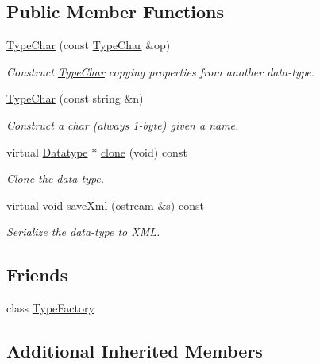 \subsection*{Public Member Functions}
\begin{DoxyCompactItemize}
\item 
\mbox{\hyperlink{class_type_char_a4831c7367bf6b04217f778e3afc9ff3c}{Type\+Char}} (const \mbox{\hyperlink{class_type_char}{Type\+Char}} \&op)
\begin{DoxyCompactList}\small\item\em Construct \mbox{\hyperlink{class_type_char}{Type\+Char}} copying properties from another data-\/type. \end{DoxyCompactList}\item 
\mbox{\hyperlink{class_type_char_a83cc6e2d7bc00de3e855c118862c4aac}{Type\+Char}} (const string \&n)
\begin{DoxyCompactList}\small\item\em Construct a char (always 1-\/byte) given a name. \end{DoxyCompactList}\item 
virtual \mbox{\hyperlink{class_datatype}{Datatype}} $\ast$ \mbox{\hyperlink{class_type_char_af09a0ae04e18990511b4f3bda2141559}{clone}} (void) const
\begin{DoxyCompactList}\small\item\em Clone the data-\/type. \end{DoxyCompactList}\item 
virtual void \mbox{\hyperlink{class_type_char_a29dadba593626c5de123934a5dcbe894}{save\+Xml}} (ostream \&s) const
\begin{DoxyCompactList}\small\item\em Serialize the data-\/type to X\+ML. \end{DoxyCompactList}\end{DoxyCompactItemize}
\subsection*{Friends}
\begin{DoxyCompactItemize}
\item 
class \mbox{\hyperlink{class_type_char_ac8c1945d0a63785e78b3e09a13226ed6}{Type\+Factory}}
\end{DoxyCompactItemize}
\subsection*{Additional Inherited Members}



